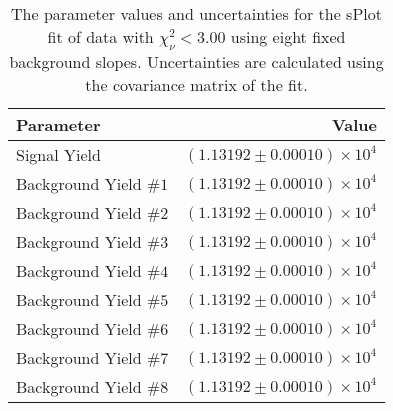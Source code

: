 
\begin{table}[ht]
    \begin{center}
        \begin{tabular}{lr}\toprule
            Parameter & Value \\\midrule
            Signal Yield & $(1.13192 \pm 0.00010) \times 10^{4}$ \\
            Background Yield $\#1$ & $(1.13192 \pm 0.00010) \times 10^{4}$ \\
            Background Yield $\#2$ & $(1.13192 \pm 0.00010) \times 10^{4}$ \\
            Background Yield $\#3$ & $(1.13192 \pm 0.00010) \times 10^{4}$ \\
            Background Yield $\#4$ & $(1.13192 \pm 0.00010) \times 10^{4}$ \\
            Background Yield $\#5$ & $(1.13192 \pm 0.00010) \times 10^{4}$ \\
            Background Yield $\#6$ & $(1.13192 \pm 0.00010) \times 10^{4}$ \\
            Background Yield $\#7$ & $(1.13192 \pm 0.00010) \times 10^{4}$ \\
            Background Yield $\#8$ & $(1.13192 \pm 0.00010) \times 10^{4}$ \\\bottomrule
        \end{tabular}
        \caption{The parameter values and uncertainties for the sPlot fit of data with $\chi^2_\nu < 3.00$ using eight fixed background slopes. Uncertainties are calculated using the covariance matrix of the fit.}\label{tab:splot-fit-results-chisqdof-3.00-fixed-8}
    \end{center}
\end{table}
